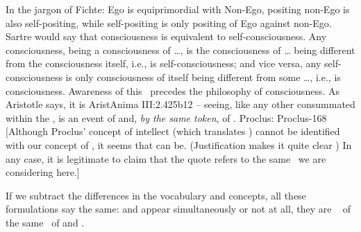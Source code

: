 In the jargon of Fichte: Ego is equiprimordial with Non-Ego, 
positing non-Ego is also self-positing, while self-positing is only 
positing of Ego against non-Ego.
Sartre would say that consciousness is equivalent to
self-consciousness. Any consciousness, being a consciousness of 
{\ldots}, is the consciousness of {\ldots} being different 
from the consciousness itself, i.e., is self-consciousness; and 
vice versa, any self-consciousness is only consciousness of itself 
being different from some {\ldots}, i.e., is
consciousness.
%
Awareness of this \equin\ precedes the philosophy of consciousness.  As Aristotle
says, it is \citet{by sight that one perceives that one sees}{AristAnima}{
  III:2.425b12} -- seeing, like any other  consummated within the \hoa,
is an event of  and, {\em by the same token}, of
. Proclus: \citet{Every intellect apprehends itself. [...]
  Every intellect in its act knows that it apprehends. Intellect whose feature
  is to apprehend is not different from that which apprehends that it
  apprehends.}{Proclus}{\para{}-168 [Although Proclus' concept of intellect (which
  translates ) cannot be identified with our 
  concept of , it seems that  can
  be. (Justification makes it quite clear )
  In any case, it is legitimate to claim that the
  quote refers to the same \equin\ we are considering here.]}


If we subtract the differences in the vocabulary
and concepts, all these formulations say the same:  and
 appear simultaneously or not at all, they are \equi\
 of the same \nexus\ of  and . 


